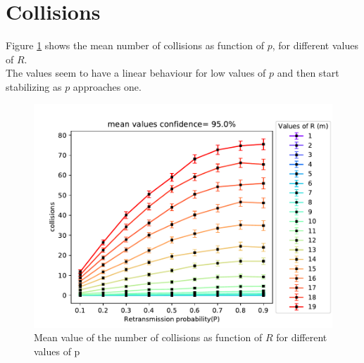 \section{Collisions}
Figure \ref{fig:collisionsPR} shows the mean number of collisions as function of $p$, for different values of $R$.\\
The values seem to have a linear behaviour for low values of $p$ and then start stabilizing as $p$ approaches one.
\begin{figure}[H]
    \begin{center}
        \includegraphics[scale=.7,trim={0 0 0 0.8cm},clip]{img/big_collisions_p_mean_95.0.pdf}
    \end{center}
    \vspace*{-0.5cm}
    \caption{Mean value of the number of collisions as function of $R$ for different values of p}
    \label{fig:collisionsPR}
\end{figure}

